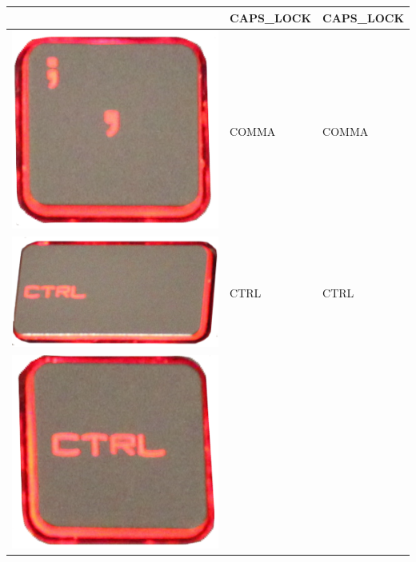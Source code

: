 \begin{longtable}{|cll|}
\begin{minipage}[c]{.3\textwidth}
\vspace{0.2cm}
\end{minipage} & CAPS\_LOCK & CAPS\_LOCK\\
\hline
\begin{minipage}[c]{.3\textwidth}
\vspace{0.2cm}
\includegraphics[scale=0.06]{Images/KeyMapping/COMMA}
\vspace{0.2cm}
\end{minipage} & COMMA & COMMA\\
\hline
\begin{minipage}[c]{.3\textwidth}
\vspace{0.2cm}
\includegraphics[scale=0.06]{Images/KeyMapping/CTRL}
\vspace{0.2cm}
\end{minipage} & CTRL & CTRL\\
\hline
\begin{minipage}[c]{.3\textwidth}
\vspace{0.2cm}
\includegraphics[scale=0.06]{Images/KeyMapping/CTRL_R}

\end{minipage}
\end{longtable}
